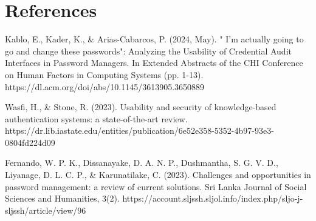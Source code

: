 \documentclass[a4paper, 12pt]{article}
\begin{document}

\newpage
\section*{References}


Kablo, E., Kader, K., \& Arias-Cabarcos, P. (2024, May). " I'm actually going to go and change these passwords": Analyzing the Usability of Credential Audit Interfaces in Password Managers. In Extended Abstracts of the CHI Conference on Human Factors in Computing Systems (pp. 1-13). 
https://dl.acm.org/doi/abs/10.1145/3613905.3650889

\vspace{0.4cm}

Wasfi, H., \& Stone, R. (2023). Usability and security of knowledge-based authentication systems: a state-of-the-art review. 
https://dr.lib.iastate.edu/entities/publication/6e52e358-5352-4b97-93e3-0804fd224d09

\vspace{0.4cm}

Fernando, W. P. K., Dissanayake, D. A. N. P., Dushmantha, S. G. V. D., Liyanage, D. L. C. P., \& Karunatilake, C. (2023). Challenges and opportunities in password management: a review of current solutions. Sri Lanka Journal of Social Sciences and Humanities, 3(2). 
https://account.sljssh.sljol.info/index.php/sljo-j-sljssh/article/view/96

\printbibliography
\end{document}
